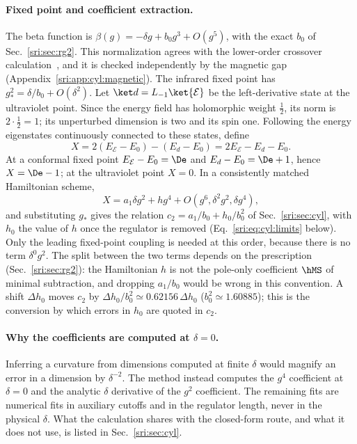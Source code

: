 \paragraph{Fixed point and coefficient extraction.} The beta function is $\beta(g)=-\delta g+b_0g^3+O(g^5)$, with the
exact $b_0$ of Sec.~\ref{sri:sec:rg2}. This normalization agrees with the lower-order crossover
calculation~\cite{sri:Behan:2017emf}, and it is checked independently by the magnetic gap (Appendix~\ref{sri:app:cyl:magnetic}).
The infrared fixed point has $g_*^2=\delta/b_0+O(\delta^2)$. Let $\ket d=L_{-1}\ket{\mathcal E}$ be the left-derivative
state at the ultraviolet point. Since the energy field has holomorphic weight $\frac12$, its norm is $2\cdot\frac12=1$;
its unperturbed dimension is two and its spin one. Following the energy eigenstates continuously connected to these
states, define
\begin{equation}
 X=2(E_{\mathcal E}-E_0)-(E_d-E_0)=2E_{\mathcal E}-E_d-E_0.
 \label{sri:eq:cyl:X}
\end{equation}
At a conformal fixed point $E_{\mathcal E}-E_0=\De$ and $E_d-E_0=\De+1$, hence $X=\De-1$; at the ultraviolet point
$X=0$. In a consistently matched Hamiltonian scheme,
\begin{equation}
 X=a_1\delta g^2+hg^4+O(g^6,\delta^2g^2,\delta g^4),
\end{equation}
and substituting $g_*$ gives the relation $c_2=a_1/b_0+h_0/b_0^2$ of Sec.~\ref{sri:sec:cyl}, with $h_0$ the value of
$h$ once the regulator is removed (Eq.~\eqref{sri:eq:cyl:limits} below). Only the leading fixed-point coupling is needed at
this order, because there is no term $\delta^0g^2$. The split between the two terms depends on the prescription
(Sec.~\ref{sri:sec:rg2}): the Hamiltonian $h$ is not the pole-only coefficient $\hMS$ of minimal subtraction, and dropping
$a_1/b_0$ would be wrong in this convention. A shift $\Delta h_0$ moves $c_2$ by $\Delta h_0/b_0^2\simeq0.62156\,\Delta
h_0$ ($b_0^2\simeq1.60885$); this is the conversion by which errors in $h_0$ are quoted in $c_2$.

\paragraph{Why the coefficients are computed at $\delta=0$.} Inferring a curvature from dimensions computed at finite
$\delta$ would magnify an error in a dimension by $\delta^{-2}$. The method instead computes the $g^4$ coefficient at
$\delta=0$ and the analytic $\delta$ derivative of the $g^2$ coefficient. The remaining fits are numerical fits in
auxiliary cutoffs and in the regulator length, never in the physical $\delta$. What the calculation shares with the
closed-form route, and what it does not use, is listed in Sec.~\ref{sri:sec:cyl}.

